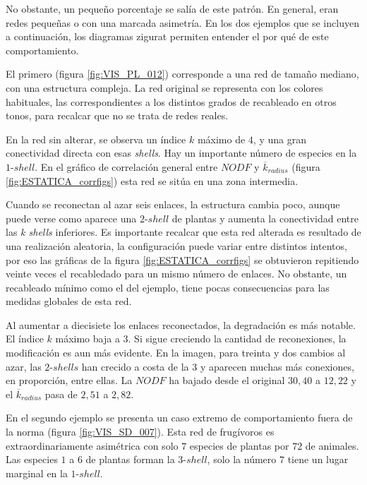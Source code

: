 No obstante, un pequeño porcentaje se salía de este patrón. En general, eran redes pequeñas o con una marcada asimetría. En los dos ejemplos que se incluyen a continuación, los diagramas zigurat permiten entender el por qué de este comportamiento.

El primero (figura \ref{fig:VIS_PL_012}) corresponde a una red de tamaño mediano, con una estructura compleja. La red original se representa con los colores habituales, las correspondientes a los distintos grados de recableado en otros tonos, para recalcar que no se trata de redes reales. 

En la red sin alterar, se observa un índice $k$ máximo de $4$, y una gran conectividad directa con esas \textit{shells}. Hay un importante número de especies en la $1$-$shell$. En el gráfico de correlación general entre $NODF$ y $\overline k_{radius}$ (figura \ref{fig:ESTATICA_corrfigs}) esta red se sitúa en una zona intermedia.

Cuando se reconectan al azar seis enlaces, la estructura cambia poco, aunque puede verse como aparece una $2$-$shell$ de plantas y aumenta la conectividad entre las \textit{k shells} inferiores. Es importante recalcar que esta red alterada es resultado de una realización aleatoria, la configuración puede variar entre distintos intentos, por eso las gráficas de la figura \ref{fig:ESTATICA_corrfigs} se obtuvieron repitiendo veinte veces el recabledado para un mismo número de enlaces. No obstante, un recableado mínimo como el del ejemplo, tiene pocas consecuencias para las medidas globales de esta red.

Al aumentar a diecisiete los enlaces reconectados, la degradación es más notable. El índice $k$ máximo baja a $3$. Si sigue creciendo la cantidad de reconexiones, la modificación es aun más evidente. En la imagen, para treinta y dos cambios al azar, las $2$-$shells$ han crecido a costa de la $3$ y aparecen muchas más conexiones, en proporción, entre ellas. La $NODF$ ha bajado desde el original $30,40$ a $12,22$ y el $\overline k_{radius}$ pasa de $2,51$ a $2,82$. 

En el segundo ejemplo se presenta un caso extremo de comportamiento fuera de la norma  (figura \ref{fig:VIS_SD_007}). Esta red de frugívoros es extraordinariamente asimétrica con solo $7$ especies de plantas por $72$ de animales. Las especies $1$ a $6$ de plantas forman la $3$-$shell$, solo la número $7$ tiene un lugar marginal en la $1$-$shell$.

